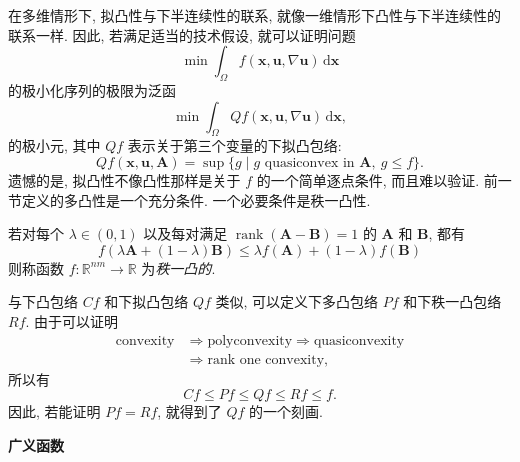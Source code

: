 在多维情形下, 拟凸性与下半连续性的联系, 就像一维情形下凸性与下半连续性的联系一样. 因此, 若满足适当的技术假设, 就可以证明问题
\begin{equation}\label{eq:multidimensional-unrelaxed-variational-problem}
\min\int_\Omega f(\bm{x},\bm{u},\nabla\bm{u})\,\mathrm{d}\bm{x}
\end{equation}
的极小化序列的极限为泛函
\begin{equation}\label{eq:multidimensional-quasiconvexified-variational-problem}
\min\int_\Omega Qf(\bm{x},\bm{u},\nabla\bm{u})\,\mathrm{d}\bm{x},
\end{equation}
的极小元, 其中 $Qf$ 表示关于第三个变量的下拟凸包络:
\begin{equation}\label{eq:lower-quasiconvex-envelope-definition}
Qf(\bm{x},\bm{u},\bm{A})=\sup\{g\mid g\text{ quasiconvex in }\bm{A},\ g\leq f\}.
\end{equation}
遗憾的是, 拟凸性不像凸性那样是关于 $f$ 的一个简单逐点条件, 而且难以验证. 前一节定义的多凸性是一个充分条件. 一个必要条件是秩一凸性.

\begin{Definition}
\label{def:rank-one-convex-function}
若对每个 $\lambda\in(0,1)$ 以及每对满足 $\operatorname{rank}(\bm{A}-\bm{B})=1$ 的 $\bm{A}$ 和 $\bm{B}$, 都有
\begin{equation}\label{eq:rank-one-convex-function-definition}
f(\lambda\bm{A}+(1-\lambda)\bm{B})\leq\lambda f(\bm{A})+(1-\lambda)f(\bm{B})
\end{equation}
则称函数 $f:\mathbb{R}^{nm}\to\mathbb{R}$ 为\emph{秩一凸的}.
\end{Definition}

与下凸包络 $Cf$ 和下拟凸包络 $Qf$ 类似, 可以定义下多凸包络 $Pf$ 和下秩一凸包络 $Rf$. 由于可以证明
\begin{equation}\label{eq:convexity-polyconvexity-quasiconvexity-rank-one-implications}
\begin{aligned}\text{convexity}&\Longrightarrow\text{polyconvexity}\Longrightarrow\text{quasiconvexity}\\&\Longrightarrow\text{rank one convexity},\end{aligned}
\end{equation}
所以有
\begin{equation}\label{eq:convex-envelope-order-relations}
Cf\leq Pf\leq Qf\leq Rf\leq f.
\end{equation}
因此, 若能证明 $Pf=Rf$, 就得到了 $Qf$ 的一个刻画.

\textbf{广义函数}

